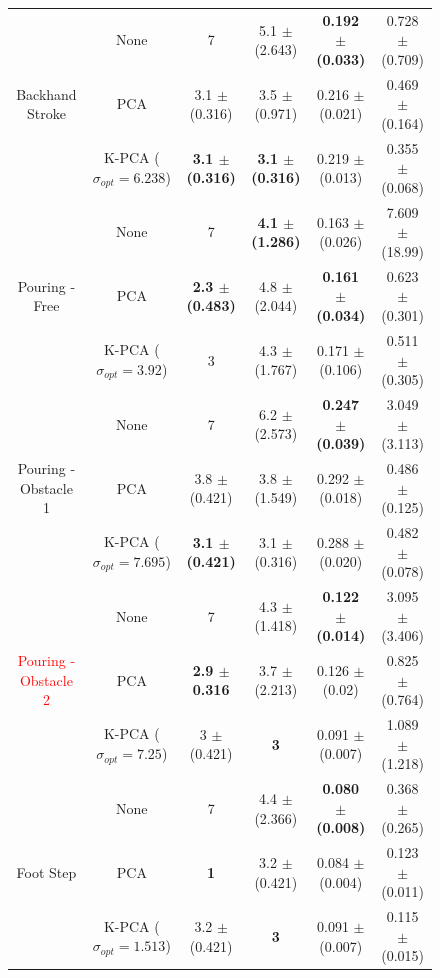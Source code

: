 \documentclass[letterpaper, 10 pt, conference,fleqn]{ieeeconf}
\begin{document}
\begin{figure}[!ht]
\begin{minipage}[b]{0.7\textwidth}
{\begin{tabular}{cc|cc|cc}
	\multicolumn{1}{c}{\multirow{3}{*}{Backhand Stroke}} & None & 7 & 5.1 $\pm$ (2.643) &\textbf{ 0.192 $\pm$ (0.033)} &  \cellcolor{blue!5} 0.728 $\pm$ (0.709)  \\
		    \multicolumn{1}{c}{\multirow{3}{*}{($N=11,M=1223$)}} & PCA & 3.1 $\pm$ (0.316) & 3.5 $\pm$ (0.971) & 0.216 $\pm$ (0.021) & \cellcolor{blue!10} 0.469 $\pm$ (0.164) \\	
			& K-PCA ($\sigma_{opt} = 6.238$) & \textbf{3.1 $\pm$ (0.316)} & \textbf{3.1 $\pm$ (0.316)} & 0.219 $\pm$ (0.013) & \cellcolor{blue!15} 0.355 $\pm$ (0.068)   \\
			\hline
		
	\multicolumn{1}{c}{\multirow{3}{*}{Pouring - Free}} & None & 7 & \textbf{ 4.1 $\pm$ (1.286)} & 0.163 $\pm$ (0.026) & 7.609 $\pm$ (18.99) \\
   \multicolumn{1}{c}{\multirow{3}{*}{($N=9,M=1032$)}} & PCA & \textbf{ 2.3 $\pm$ (0.483)} & 4.8 $\pm$ (2.044) & \textbf{ 0.161 $\pm$ (0.034) } & \cellcolor{blue!10} 0.623 $\pm$ (0.301) \\	
	& K-PCA ($\sigma_{opt} = 3.92$) & 3 & 4.3 $\pm$ (1.767) & 0.171 $\pm$ (0.106) & \cellcolor{blue!15} 0.511 $\pm$ (0.305)   \\
				\hline
	\multicolumn{1}{c}{\multirow{3}{*}{Pouring - Obstacle 1}} & None & 7 & 6.2 $\pm$ (2.573) & \textbf{0.247 $\pm$ (0.039)} & 3.049 $\pm$ (3.113) \\
   \multicolumn{1}{c}{\multirow{3}{*}{($N=11,M=1232$)}} & PCA & 3.8 $\pm$ (0.421) & 3.8 $\pm$ (1.549) & 0.292 $\pm$ (0.018) & \cellcolor{blue!10} 0.486 $\pm$ (0.125) \\	
				& K-PCA ($\sigma_{opt} = 7.695$) & \textbf{ 3.1 $\pm$ (0.421) } & 3.1 $\pm$ (0.316) & 0.288 $\pm$ (0.020) & \cellcolor{blue!15} 0.482 $\pm$ (0.078)   \\
				\hline	

	\multicolumn{1}{c}{\multirow{3}{*}{\textcolor{red}{Pouring - Obstacle 2}}} & None & 7 & 4.3 $\pm$ (1.418) & \textbf{ 0.122 $\pm$ (0.014) } & 3.095 $\pm$ (3.406) \\
   \multicolumn{1}{c}{\multirow{3}{*}{($N=7,M=1406$)}} & PCA & \textbf{ 2.9 $\pm$ 0.316 } & 3.7 $\pm$ (2.213) & 0.126 $\pm$ (0.02) & \cellcolor{blue!15} 0.825 $\pm$ (0.764) \\	
	& K-PCA ($\sigma_{opt} = 7.25$) & 3 $\pm$ (0.421) & \textbf{3} & 0.091 $\pm$ (0.007) & \cellcolor{blue!10} 1.089 $\pm$ (1.218)  \\
				\hline

	\multicolumn{1}{c}{\multirow{3}{*}{Foot Step}} & None & 7 & 4.4 $\pm$ (2.366) & \textbf{ 0.080 $\pm$ (0.008) } & 0.368 $\pm$ (0.265)  \\
	\multicolumn{1}{c}{\multirow{3}{*}{($N=8,M=1058$)}} & PCA & \textbf{1} & 3.2 $\pm$ (0.421) & 0.084 $\pm$ (0.004) & \cellcolor{blue!10}  0.123 $\pm$ (0.011) \\	
	& K-PCA ($\sigma_{opt} = 1.513$) & 3.2 $\pm$ (0.421) & \textbf{3} &  0.091 $\pm$ (0.007) & \cellcolor{blue!15} 0.115 $\pm$ (0.015)   \\
				\hline		
	

\end{tabular}}
\end{minipage}
\end{figure}
\end{document}
